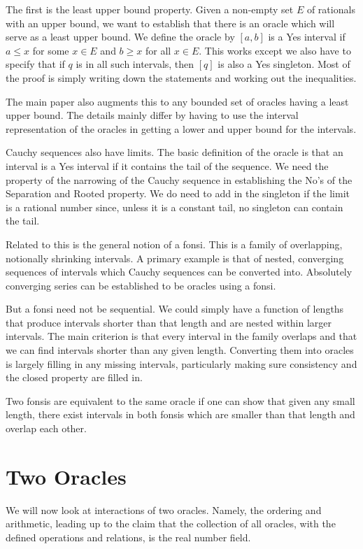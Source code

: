 \documentclass[12pt]{article}
\theoremstyle{remark}
\begin{document}
The first is the least upper bound property. Given a non-empty set $E$ of rationals with an upper bound, we want to establish that there is an oracle which will serve as a least upper bound. We define the oracle by $[a,b]$ is a Yes interval if $a\leq x$ for some $x \in E$ and $b\geq x$ for all $x\in E$. This works except we also have to specify that if $q$ is in all such intervals, then $[q]$ is also a Yes singleton. Most of the proof is simply writing down the statements and working out the inequalities. 

The main paper also augments this to any bounded set of oracles having a least upper bound. The details mainly differ by having to use the interval representation of the oracles in getting a lower and upper bound for the intervals. 

Cauchy sequences also have limits. The basic definition of the oracle is that an interval is a Yes interval if it contains the tail of the sequence. We need the property of the narrowing of the Cauchy sequence in establishing the No's of the Separation and Rooted property. We do need to add in the singleton if the limit is a rational number since, unless it is a constant tail, no singleton can contain the tail. 

Related to this is the general notion of a fonsi. This is a family of overlapping, notionally shrinking intervals. A primary example is that of nested, converging sequences of intervals which Cauchy sequences can be converted into. Absolutely converging series can be established to be oracles using a fonsi. 

But a fonsi need not be sequential. We could simply have a function of lengths that produce intervals shorter than that length and are nested within larger intervals. The main criterion is that every interval in the family overlaps and that we can find intervals shorter than any given length. Converting them into oracles is largely filling in any missing intervals, particularly making sure consistency and the closed property are filled in.  

Two fonsis are equivalent to the same oracle if one can show that given any small length, there exist intervals in both fonsis which are smaller than that length and overlap each other. 

\section{Two Oracles}

We will now look at interactions of two oracles. Namely, the ordering and arithmetic, leading up to the claim that the collection of all oracles, with the defined operations and relations, is the real number field. 
\end{document}
